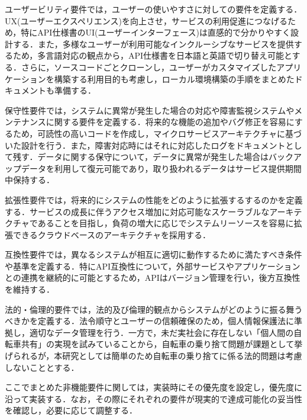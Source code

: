           \par ユーザービリティ要件では，ユーザーの使いやすさに対しての要件を定義する．UX(ユーザーエクスペリエンス)を向上させ，サービスの利用促進につなげるため，特にAPI仕様書のUI(ユーザーインターフェース)は直感的で分かりやすく設計する．また，多様なユーザーが利用可能なインクルーシブなサービスを提供するため，多言語対応の観点から，API仕様書を日本語と英語で切り替え可能とする．さらに，ソースコードごとクローンし，ユーザーがカスタマイズしたアプリケーションを構築する利用目的も考慮し，ローカル環境構築の手順をまとめたドキュメントも準備する．
          \par 保守性要件では，システムに異常が発生した場合の対応や障害監視システムやメンテナンスに関する要件を定義する．将来的な機能の追加やバグ修正を容易にするため，可読性の高いコードを作成し，マイクロサービスアーキテクチャに基づいた設計を行う．また，障害対応時にはそれに対応したログをドキュメントとして残す．データに関する保守について，データに異常が発生した場合はバックアップデータを利用して復元可能であり，取り扱われるデータはサービス提供期間中保持する．
          \par 拡張性要件では，将来的にシステムの性能をどのように拡張するするのかを定義する．サービスの成長に伴うアクセス増加に対応可能なスケーラブルなアーキテクチャであることを目指し，負荷の増大に応じでシステムリーソースを容易に拡張できるクラウドベースのアーキテクチャを採用する．
          \par 互換性要件では，異なるシステムが相互に適切に動作するために満たすべき条件や基準を定義する．特にAPI互換性について，外部サービスやアプリケーションとの連携を継続的に可能とするため，APIはバージョン管理を行い，後方互換性を維持する．
          \par 法的・倫理的要件では，法的及び倫理的観点からシステムがどのように振る舞うべきかを定義する．法令順守とユーザーの信頼確保のため，個人情報保護法に準拠し，適切なデータ管理を行う．一方で，未だ実社会に存在しない「個人間の自転車共有」の実現を試みていることから，自転車の乗り捨て問題が課題として挙げられるが，本研究としては簡単のため自転車の乗り捨てに係る法的問題は考慮しないこととする．
          \par ここでまとめた非機能要件に関しては，実装時にその優先度を設定し，優先度に沿って実装する．なお，その際にそれぞれの要件が現実的で達成可能化の妥当性を確認し，必要に応じて調整する．
      
